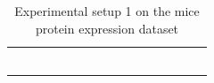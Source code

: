 \documentclass{tufte-book}
\begin{document}
\begin{Definition}
\begin{table}[]
\begin{tabular}{cccccccccccccccc}
                        &                                                                                                  &                                 &                              &                             &                              &                             &                              &                             &                              &                             &                              &  &  &  &  \\
                        &                                                                                                  &                                 &                              &                             &                              &                             &                              &                             &                              &                             &                              &  &  &  &  \\
                        &                                                                                                  &                                 &                              &                             &                              &                             &                              &                             &                              &                             &                              &  &  &  &  \\
                        &                                                                                                  &                                 &                              &                             &                              &                             &                              &                             &                              &                             &                              &  &  &  &  \\
                        &                                                                                                  &                                 &                              &                             &                              &                             &                              &                             &                              &                             &                              &  &  &  &  \\
                        &                                                                                                  &                                 &                              &                             &                              &                             &                              &                             &                              &                             &                              &  &  &  & 
\caption{Experimental setup 1 on the mice protein expression dataset}
			\end{tabular}
\end{table}



\end{Definition}
\end{document}
